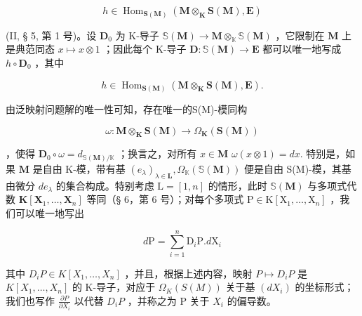 \[
h \in \operatorname{Hom} _ {\mathbf {S} (\mathbf {M})} (\mathbf {M} \otimes_ {\mathbf {K}} \mathbf {S} (\mathbf {M}), \mathbf {E})
\]

(II, § 5, 第 1 号)。设 \(\mathbf{D}_0\) 为 K-导子 \(\mathbb{S}(\mathbf{M}) \to \mathbf{M} \otimes_{\mathbb{K}} \mathbb{S}(\mathbf{M})\) ，它限制在 \(\mathbf{M}\) 上是典范同态 \(x \mapsto x \otimes 1\) ；因此每个 K-导子 \(\mathbf{D}: \mathbb{S}(\mathbf{M}) \to \mathbf{E}\) 都可以唯一地写成 \(h \circ \mathbf{D}_0\) ，其中

\[
h \in \operatorname{Hom} _ {\mathbf {S} (\mathbf {M})} (\mathbf {M} \otimes_ {\mathbf {K}} \mathbf {S} (\mathbf {M}), \mathbf {E}).
\]

由泛映射问题解的唯一性可知，存在唯一的S(M)-模同构

\[
\omega : \mathbf {M} \otimes_ {\mathbf {K}} \mathbf {S} (\mathbf {M}) \rightarrow \Omega_ {\mathbf {K}} (\mathbf {S} (\mathbf {M}))
\]

，使得 \(\mathbf{D}_0\circ \omega = d_{\mathbb{S}(\mathbf{M}) / \mathbb{K}}\) ；换言之，对所有 \(x\in \mathbf{M}\) \(\omega (x\otimes 1) = dx.\) 特别是，如果 \(\mathbf{M}\) 是自由 K-模，带有基 \((e_{\lambda})_{\lambda \in \mathbf{L}},\Omega_{\mathbb{K}}(\mathbb{S}(\mathbf{M}))\) 便是自由 S(M)-模，其基由微分 \(de_{\lambda}\) 的集合构成。特别考虑 \(\mathrm{L} = [1,n]\) 的情形，此时 \(\mathbb{S}(\mathbf{M})\) 与多项式代数 \(\mathbf{K}[\mathbf{X}_1,\dots ,\mathbf{X}_n]\) 等同（§ 6，第 6 号）；对每个多项式 \(\mathrm{P}\in \mathrm{K}[\mathrm{X}_1,\dots ,\mathrm{X}_n]\) ，我们可以唯一地写出

\[
d \mathrm{P} = \sum_ {i = 1} ^ {n} \mathrm{D} _ {i} \mathrm{P}. d \mathrm{X} _ {i}
\]

其中 \(D_{i}P \in K[X_{1}, \ldots, X_{n}]\) ，并且，根据上述内容，映射 \(P \mapsto D_{i}P\) 是 \(K[X_{1}, \ldots, X_{n}]\) 的 K-导子，对应于 \(\Omega_{K}(S(M))\) 关于基 \((dX_{i})\) 的坐标形式；我们也写作 \(\frac{\partial P}{\partial X_{i}}\) 以代替 \(D_{i}P\) ，并称之为 P 关于 \(X_{i}\) 的偏导数。

